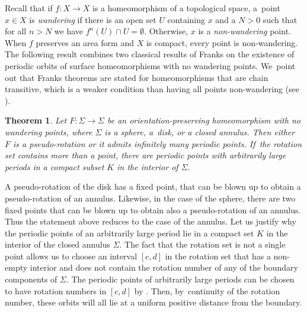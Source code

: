 \documentclass[11pt]{article}
\newtheorem{theorem}{Theorem}[section]
\theoremstyle{definition}
\begin{document}
Recall that if $f:X\to X$ is a homeomorphism of a topological space, a~point $x\in X$ is \emph{wandering} if there is an open set $U$ containing $x$ and a $N>0$ such that for all $n>N$ we have $f^n(U)\cap U=\emptyset$. Otherwise, $x$ is a \emph{non-wandering} point. When $f$ preserves an area form and $X$ is compact, every point is non-wandering. The following result combines two classical results of Franks \cite{F1, F2} on the existence of periodic orbits of surface homeomorphisms with no wandering points. We~point out that Franks theorems are stated for homeomorphisms that are chain transitive, which is a weaker condition than having all points non-wandering (see \cite[Prop.\,1.2]{F1}).

\begin{theorem}\label{thm:Fk}
Let $F:\Sigma \rightarrow \Sigma$ be an orientation-preserving homeomorphism with no wandering points, where $\Sigma$ is a sphere, a~disk, or a closed annulus. Then either~$F$ is a pseudo-rotation or it admits infinitely many periodic points. If~the rotation set contains more than a point, there are periodic points with arbitrarily large periods in a compact subset $K$ in the interior of $\Sigma$.
\end{theorem}

{A pseudo-rotation of the disk has a fixed point, that can be blown up to obtain a pseudo-rotation of an annulus. Likewise, in the case of the sphere, there are two fixed points that can be blown up to obtain also a pseudo-rotation of an annulus. Thus the statement above reduces to the case of the annulus.}{ Let us justify why the periodic points of an arbitrarily large period lie in a compact set $K$ in the interior of the closed annulus $\Sigma$. The fact that the rotation set is not a single point allows us to choose an interval $[c,d]$ in the rotation set that has a non-empty interior and does not contain the rotation number of any of the boundary components of $\Sigma$. The periodic points of arbitrarily large periods can be chosen to have rotation numbers in $[c,d]$ by \cite[Cor.\,2.4]{F1}. Then, by~continuity of the rotation number, these orbits will all lie at a uniform positive distance from the boundary.}
\end{document}
